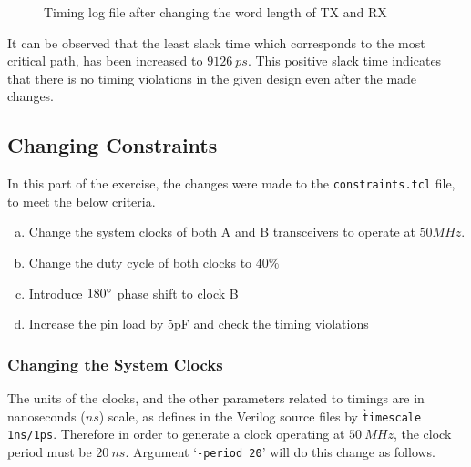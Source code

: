 \documentclass[a4paper,11pt]{article}%
\begin{document}
\begin{figure}[h]
	\centering
	\caption{Timing log file after changing the word length of TX and RX}
	\label{fig:timing_log2}
\end{figure}

It can be observed that the least slack time which corresponds to the most critical path, has been increased to $9126~ps$. This positive slack time indicates that there is no timing violations in the given design even after the made changes. 
\pagebreak
\subsection{Changing Constraints}

In this part of the exercise, the changes were made to the {\tt constraints.tcl} file, to meet the below criteria.

\begin{enumerate}[a.]
	\item Change the system clocks of both A and B transceivers to operate at $50MHz$.
	\item Change the duty cycle of both clocks to $40\%$
	\item Introduce $180\degree$ phase shift to clock B
	\item Increase the pin load by 5pF and check the timing violations
\end{enumerate}

\subsubsection{Changing the System Clocks}

The units of the clocks, and the other parameters related to timings are in nanoseconds ($ns$) scale, as defines in the Verilog source files by {\tt \`timescale 1ns/1ps}. Therefore in order to generate a clock operating at $50~MHz$, the clock period must be $20~ns$.  Argument `{\tt -period 20}' will do this change as follows.
\end{document}
